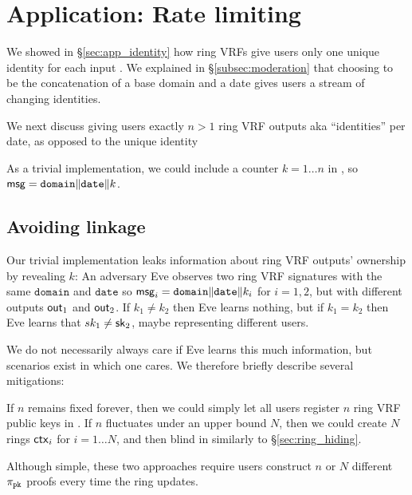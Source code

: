 \section{Application: Rate limiting}
\label{sec:app_rate_limits}

We showed in \S\ref{sec:app_identity} how ring VRFs give users only
one unique identity for each input \msg.  
We explained in \S\ref{subsec:moderation} that choosing \msg to be
the concatenation of a base domain and a date gives users a stream of changing identities.

We next discuss giving users exactly $n > 1$ ring VRF outputs aka
``identities'' per date, as opposed to the unique identity 



As a trivial implementation, we could include a counter $k = 1 \ldots n$
in \msg, so $\mathsf{msg} = \mathtt{domain} \| \mathtt{date} \| k$.


\subsection{Avoiding linkage}

Our trivial implementation leaks information about ring VRF outputs'
 ownership by revealing $k$:
%
An adversary Eve observes two ring VRF signatures with the same
$\mathtt{domain}$ and $\mathtt{date}$ so
$\mathsf{msg}_i = \mathtt{domain} \| \mathtt{date} \| k_i$
for $i=1,2$, but with different outputs ${\mathsf{out}}_1$ and ${\mathsf{out}}_2$.
If $k_1 \ne k_2$ then Eve learns nothing, but if $k_1 = k_2$ then
 Eve learns that $sk_1 \ne \mathsf{sk}_2$, maybe representing different users. 

We do not necessarily always care if Eve learns this much information,
but scenarios exist in which one cares.  We therefore briefly describe
several mitigations:

If $n$ remains fixed forever, then we could simply let all users
register $n$ ring VRF public keys in \ctx.
If $n$ fluctuates under an upper bound $N$, then we could create $N$
rings $\mathsf{ctx}_i$ for $i = 1 \ldots N$, and
 then blind \comring in \pifast similarly to \S\ref{sec:ring_hiding}.

Although simple, these two approaches require users construct $n$ or $N$
different $\pi_{\mathtt{pk}}$ proofs every time the ring \ctx updates.

